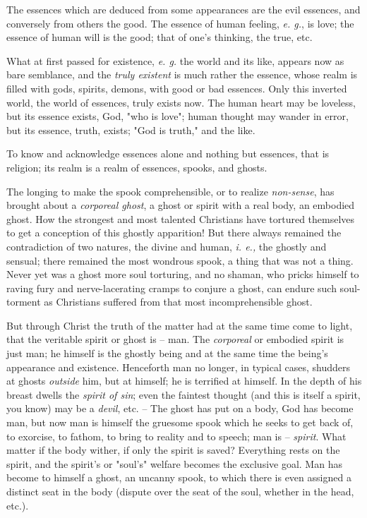 \documentclass[a4paper]{book}
\begin{document}
The essences which are deduced from some appearances are the evil essences, 
and conversely from others the good. The essence of human feeling, \textit{e. 
g.}, is love; the essence of human will is the good; that of one's thinking, 
the true, etc.

What at first passed for existence, \textit{e. g.} the world and its like, 
appears now as bare semblance, and the \textit{truly existent} is much rather 
the essence, whose realm is filled with gods, spirits, demons, with good or 
bad essences. Only this inverted world, the world of essences, truly exists 
now. The human heart may be loveless, but its essence exists, God, "{}who is 
love"{}; human thought may wander in error, but its essence, truth, exists; 
"{}God is truth,"{} and the like.

To know and acknowledge essences alone and nothing but essences, that is 
religion; its realm is a realm of essences, spooks, and ghosts.

The longing to make the spook comprehensible, or to realize 
\textit{non-sense}, has brought about a \textit{corporeal ghost}, a ghost or 
spirit with a real body, an embodied ghost. How the strongest and most 
talented Christians have tortured themselves to get a conception of this 
ghostly apparition! But there always remained the contradiction of two 
natures, the divine and human, \textit{i. e.,} the ghostly and sensual; there 
remained the most wondrous spook, a thing that was not a thing. Never yet was 
a ghost more soul torturing, and no shaman, who pricks himself to raving fury 
and nerve-lacerating cramps to conjure a ghost, can endure such soul-torment 
as Christians suffered from that most incomprehensible ghost.

But through Christ the truth of the matter had at the same time come to light, 
that the veritable spirit or ghost is -- man. The \textit{corporeal} or 
embodied spirit is just man; he himself is the ghostly being and at the same 
time the being's appearance and existence. Henceforth man no longer, in 
typical cases, shudders at ghosts \textit{outside} him, but at himself; he is 
terrified at himself. In the depth of his breast dwells the \textit{spirit of 
sin}; even the faintest thought (and this is itself a spirit, you know) may be 
a \textit{devil}, etc. -- The ghost has put on a body, God has become man, but 
now man is himself the gruesome spook which he seeks to get back of, to 
exorcise, to fathom, to bring to reality and to speech; man is -- 
\textit{spirit}. What matter if the body wither, if only the spirit is saved? 
Everything rests on the spirit, and the spirit's or "{}soul's"{} welfare 
becomes the exclusive goal. Man has become to himself a ghost, an uncanny 
spook, to which there is even assigned a distinct seat in the body (dispute 
over the seat of the soul, whether in the head, etc.).
\end{document}
